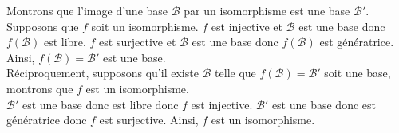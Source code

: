 \documentclass{article}
\renewenvironment{question_kholle}[2][ ]
{
	\subsection{\texorpdfstring{#2}{}}
	\notblank{#1}
	{
		\noindent #1
		\bigbreak
	}
	{}
	\begin{proof}
}
{
	\end{proof}
}
\begin{document}
\begin{question_kholle}
		Montrons que l'image d'une base $\mathcal{B}$ par un isomorphisme est une base $\mathcal{B}'$. \\
		Supposons que $f$ soit un isomorphisme. $f$ est injective et $\mathcal{B}$ est une base donc $f(\mathcal{B})$ est libre. $f$ est surjective et $\mathcal{B}$ est une base donc $f(\mathcal{B})$ est génératrice. Ainsi, $f(\mathcal{B})=\mathcal{B}'$ est une base. \\
		Réciproquement, supposons qu'il existe $\mathcal{B}$ telle que $f(\mathcal{B})=\mathcal{B}'$ soit une base, montrons que $f$ est un isomorphisme.\\
		$\mathcal{B}'$ est une base donc est libre donc $f$ est injective. $\mathcal{B}'$ est une base donc est génératrice donc $f$ est surjective.
		Ainsi, $f$ est un isomorphisme.
	\end{question_kholle}
\end{document}
